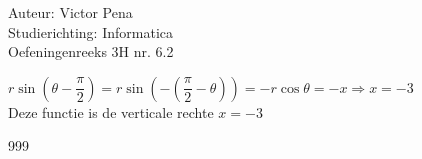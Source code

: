 \documentclass[a4paper]{article}
\begin{document}
	
	\noindent \large Auteur: Victor Pena \\
	\noindent \large Studierichting: Informatica\\
	\noindent \large Oefeningenreeks 3H nr. 6.2\\
	
	\medskip
	
	\normalsize 
	
	
	
	$r\sin\left(\theta-\dfrac{\pi}{2}\right) = r\sin\left(-\left(\dfrac{\pi}{2}-\theta\right)\right) = -r\cos\theta =-x \Rightarrow x = -3  $ \\
	
	Deze functie is de verticale rechte $x=-3$
	
	
	\begin{thebibliography}{999}
	\end{thebibliography}
\end{document}
